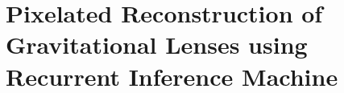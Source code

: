 
%

\chapter{Pixelated Reconstruction of Gravitational Lenses using Recurrent Inference Machine}







